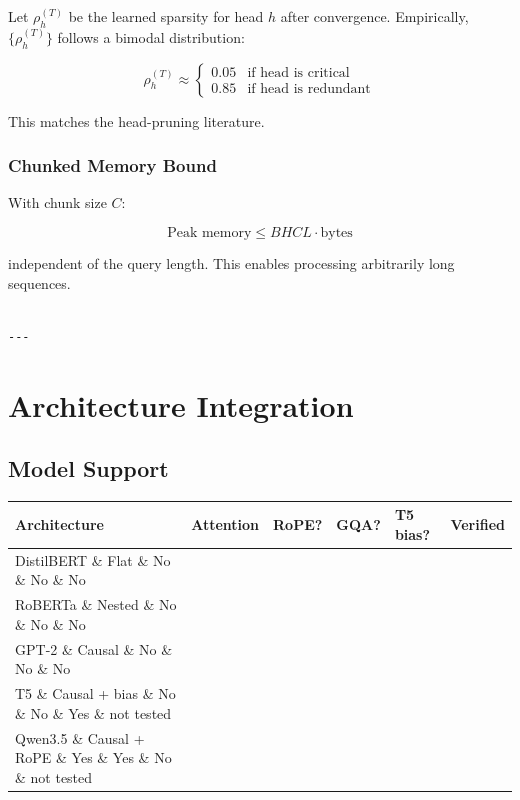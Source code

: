 Let $\rho_h^{(T)}$ be the learned sparsity for head $h$ after convergence. 
Empirically, $\{\rho_h^{(T)}\}$ follows a bimodal distribution:

\[
\rho_h^{(T)} \approx \begin{cases} 0.05 & \text{if head is critical} \\ 0.85 & \text{if head is redundant} \end{cases}
\]

This matches the head-pruning literature.

\subsubsection{Chunked Memory Bound}

With chunk size $C$:

\[
\text{Peak memory} \leq B H C L \cdot \text{bytes}
\]

independent of the query length. This enables processing arbitrarily long 
sequences.
\begin{lstlisting}

---
\end{lstlisting}


\section{Architecture Integration}

\subsection{Model Support}

\begin{table}[H]
\centering
\small
\begin{tabular}{llllll}
\toprule
\textbf{Architecture} & \textbf{Attention} & \textbf{RoPE?} & \textbf{GQA?} & \textbf{T5 bias?} & \textbf{Verified} \\
\midrule
DistilBERT \& Flat \& No \& No \& No &  \\
RoBERTa \& Nested \& No \& No \& No &  \\
GPT-2 \& Causal \& No \& No \& No &  \\
T5 \& Causal + bias \& No \& No \& Yes \& not tested \\
Qwen3.5 \& Causal + RoPE \& Yes \& Yes \& No \& not tested \\
\bottomrule
\end{tabular}
\end{table}

